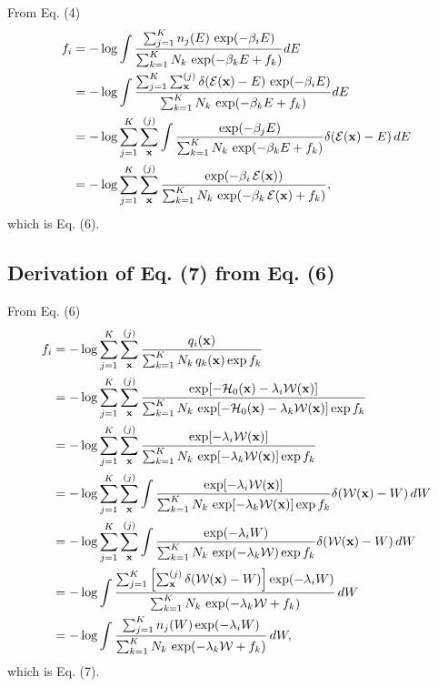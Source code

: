 \documentclass[aip,jcp,preprint,notitlepage, superscriptaddress]{revtex4-1}
\begin{document}
From Eq. (4)
\begin{align*}
f_i
&=
-\log
  \int
    \frac{
      \sum_{j = 1}^K n_j(E) \, \exp(-\beta_i E)
    }
    {
      \sum_{k = 1}^K N_k \, \exp(-\beta_k E + f_k)
    }
    dE
\\
&=
-\log
  \int
    \frac{
      \sum_{j = 1}^K \sum_{\mathbf{x}}^{(j)}
      \delta(\mathcal{E}(\mathbf{x}) - E) \, \exp(-\beta_i E)
    }
    {
      \sum_{k = 1}^K N_k \, \exp(-\beta_k E + f_k)
    }
    dE
\\
&=
-\log
  \sum_{j = 1}^K \sum_{\mathbf{x}}^{(j)}
  \int
    \frac{
      \exp(-\beta_j E)
    }
    {
      \sum_{k = 1}^K N_k \, \exp(-\beta_k E + f_k)
    }
    \delta(\mathcal{E}(\mathbf{x}) - E) \, dE
\\
&=
-\log
  \sum_{j = 1}^K \sum_{\mathbf{x}}^{(j)}
    \frac{
      \exp(-\beta_i \, \mathcal{E}(\mathbf{x}))
    }
    {
      \sum_{k = 1}^K N_k \, \exp(-\beta_k \, \mathcal{E}(\mathbf{x}) + f_k)
    },
\end{align*}
which is Eq. (6).



\subsection{Derivation of Eq. (7) from Eq. (6)}



From Eq. (6)
\begin{align*}
f_i
&=
-\log
\sum_{j = 1}^K
\sum_{\mathbf{x}}^{(j)}
\frac{
  q_i(\mathbf{x})
}
{
  \sum_{k = 1}^K N_k \, q_k(\mathbf{x}) \exp f_k
}
\\
&=
-\log
\sum_{j = 1}^K
\sum_{\mathbf{x}}^{(j)}
\frac{
  \exp[-\mathcal{H}_0(\mathbf{x}) - \lambda_i \mathcal{W}(\mathbf{x})]
}
{
  \sum_{k = 1}^K N_k \,
  \exp[-\mathcal{H}_0(\mathbf{x}) - \lambda_k \mathcal{W}(\mathbf{x})]
  \exp f_k
}
\\
&=
-\log
\sum_{j = 1}^K
\sum_{\mathbf{x}}^{(j)}
\frac{
  \exp[- \lambda_i \mathcal{W}(\mathbf{x})]
}
{
  \sum_{k = 1}^K N_k \,
  \exp[ - \lambda_k \mathcal{W}(\mathbf{x})]
  \exp f_k
}
\\
&=
-\log
\sum_{j = 1}^K
\sum_{\mathbf{x}}^{(j)}
\int
\frac{
  \exp[- \lambda_i \mathcal{W}(\mathbf{x})]
}
{
  \sum_{k = 1}^K N_k \,
  \exp[ - \lambda_k \mathcal{W}(\mathbf{x})]
  \exp f_k
}
\delta(\mathcal{W}(\mathbf{x}) - W) \, dW
\\
&=
-\log
\sum_{j = 1}^K
\sum_{\mathbf{x}}^{(j)}
\int
\frac{
  \exp(- \lambda_i W)
}
{
  \sum_{k = 1}^K N_k \,
  \exp( - \lambda_k \mathcal{W})
  \exp f_k
}
\delta(\mathcal{W}(\mathbf{x}) - W)
\, dW
\\
&=
-\log
\int
\frac{
  \sum_{j = 1}^K
  \left[
    \sum_{\mathbf{x}}^{(j)}
    \delta(\mathcal{W}(\mathbf{x}) - W)
  \right]
  \exp(- \lambda_i W)
}
{
  \sum_{k = 1}^K N_k \,
  \exp( - \lambda_k \mathcal{W} + f_k )
}
\, dW
\\
&=
-\log
\int
\frac{
  \sum_{j = 1}^K
  n_j(W)
  \exp(- \lambda_i W)
}
{
  \sum_{k = 1}^K N_k \,
  \exp( - \lambda_k \mathcal{W} + f_k )
}
\, dW,
\end{align*}
which is Eq. (7).
\end{document}
